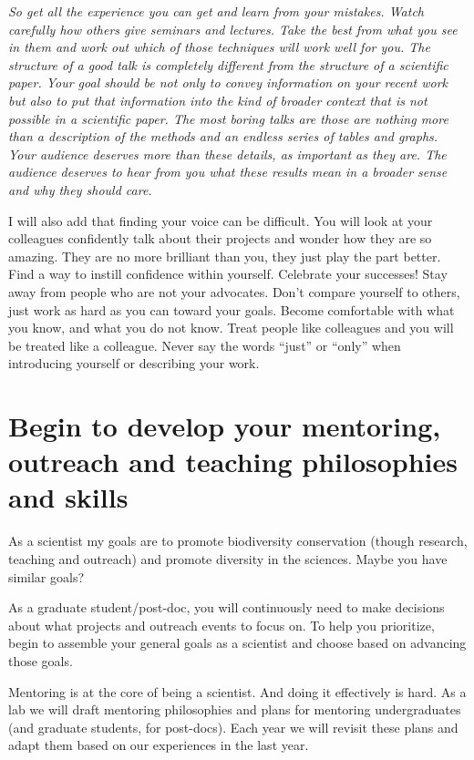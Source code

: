 \documentclass[12pt]{article}
\begin{document}
\textit{So get all the experience you can get and learn from your
  mistakes. Watch carefully how others give seminars and
  lectures. Take the best from what you see in them and work out which
  of those techniques will work well for you. The structure of a good
  talk is completely different from the structure of a scientific
  paper. Your goal should be not only to convey information on your
  recent work but also to put that information into the kind of
  broader context that is not possible in a scientific paper. The most
  boring talks are those are nothing more than a description of the
  methods and an endless series of tables and graphs. Your audience
  deserves more than these details, as important as they are. The
  audience deserves to hear from you what these results mean in a
  broader sense and why they should care.}

I will also add that finding your voice can be difficult. You will
look at your colleagues confidently talk about their projects and
wonder how they are so amazing. They are no more brilliant than you,
they just play the part better. Find a way to instill confidence
within yourself. Celebrate your successes! Stay away from people who
are not your advocates. Don't compare yourself to others, just work as
hard as you can toward your goals. Become comfortable with what you
know, and what you do not know. Treat people like colleagues and you
will be treated like a colleague. Never say the words ``just'' or
``only'' when introducing yourself or describing your work.

\section{Begin to develop your mentoring, outreach and teaching
  philosophies and skills}
\label{sec:skills}

As a scientist my goals are to promote biodiversity conservation
(though research, teaching and outreach) and promote diversity in the
sciences. Maybe you have similar goals?

As a graduate student/post-doc, you will continuously need to make
decisions about what projects and outreach events to focus on. To help
you prioritize, begin to assemble your general goals as a scientist
and choose based on advancing those goals.

Mentoring is at the core of being a scientist. And doing it
effectively is hard. As a lab we will draft mentoring philosophies and
plans for mentoring undergraduates (and graduate students, for
post-docs). Each year we will revisit these plans and adapt them based
on our experiences in the last year.
\end{document}

